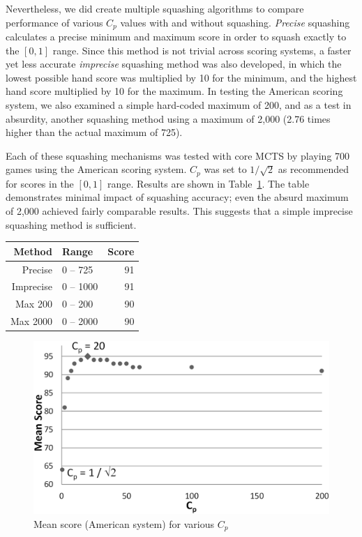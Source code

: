 \documentclass[letterpaper]{article}
\begin{document}
Nevertheless, we did create multiple squashing algorithms to compare performance of various $C_p$ values with and without squashing. {\it Precise} squashing calculates a precise minimum and maximum score in order to squash exactly to the $[0,1]$ range. Since this method is not trivial across scoring systems, a faster yet less accurate {\it imprecise} squashing method was also developed, in which the lowest possible hand score was multiplied by 10 for the minimum, and the highest hand score multiplied by 10 for the maximum. In testing the American scoring system, we also examined a simple hard-coded maximum of 200, and as a test in absurdity, another squashing method using a maximum of 2,000 (2.76 times higher than the actual maximum of 725).

Each of these squashing mechanisms was tested with core MCTS by playing 700 games using the American scoring system. $C_p$ was set to $1 / \sqrt{2}$ as recommended for scores in the $[0,1]$ range. Results are shown in Table~\ref{tbl:Squashing}. The table demonstrates minimal impact of squashing accuracy; even the absurd maximum of 2,000 achieved fairly comparable results. This suggests that a simple imprecise squashing method is sufficient.

\begin{table}
\label{tbl:Squashing}
\centering
\begin{tabular}{r l r}
\hline
{\bf Method} & {\bf Range} & {\bf Score} \\
\hline
Precise & 0 -- 725 & 91 \\
Imprecise & 0 -- 1000 & 91 \\
Max 200 & 0 -- 200 & 90 \\
Max 2000 & 0 -- 2000 & 90 \\
\hline
\end{tabular}
\end{table}

\begin{figure}
\begin{center}
\includegraphics[width=1\linewidth]{images/Cp.png}
\end{center}
\caption{Mean score (American system) for various $C_p$}
\label{fig:Cp}
\end{figure}
\end{document}
